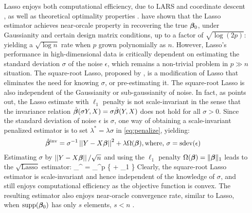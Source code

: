 \documentclass[11pt]{article}
\begin{document}
Lasso enjoys both computational efficiency, due to LARS \citep{efron_least_2004} and coordinate descent \citep{friedman_pathwise_2007}, as well as theoretical optimality properties \citep{buhlmann2011statistics}. \citet{bickel2009simultaneous} have shown that the Lasso estimator achieves near-orcale property in recovering the true $\boldsymbol{\beta}_0$, under Gaussianity and certain design matrix conditions, up to a factor of $\sqrt{\log( 2 p)}$: yielding a $\sqrt{\log n}$ rate when $p$ grown polynomially as $n$. However, Lasso's performance in high-dimensional data is critically dependent on estimating the standard deviation $\sigma$ of the noise $\epsilon$, which remains a non-trivial problem in $p \gg n$ situation. The square-root Lasso, proposed by \cite{belloni2011square}, is a modification of Lasso that eliminates the need for knowing $\sigma$, or pre-estimating it. The square-root Lasso is also independent of the Gaussianity or sub-gaussianity of noise. In fact, as \citet{giraud2014introduction} points out, the Lasso estimate with $\ell_1$ penalty is not scale-invariant in the sense that the invariance relation $\hat{\boldsymbol{\beta}}(\sigma Y, X) = \sigma \hat{\boldsymbol{\beta}}(Y, X)$ does not hold for all $\sigma > 0$. Since the standard deviation of noise $\epsilon$ is $\sigma$, one way of obtaining a scale-invariant penalized estimator is to set $\lambda^* = \lambda \sigma$ in \eqref{eq:penalize}, yielding:
\begin{align}
\hat{\boldsymbol{\beta}}^{\text{inv}} & = \sigma^{-1} \left|\left|Y - X\boldsymbol{\beta}\right|\right|^2 + \lambda \Omega(\boldsymbol{\beta}), \text{where, } \sigma = \text{sdev}(\epsilon)
\end{align}
Estimating $\sigma$ by $\left|\left|Y-X\boldsymbol{\beta}\right|\right|/\sqrt{n}$ and using the $\ell_1$ penalty $\Omega(\boldsymbol{\beta}) = \lVert\boldsymbol{\beta}\rVert_1$ leads to the $\sqrt{\text{Lasso}}$ estimator: 
\beq
\hat{\bbeta}_{\lambda}^{} = \argmin_{\bbeta \in \Re^p} \{   + \lambda \norm{\bbeta}_1 \} \label{eq:sqlasso}
\eeq
Clearly, the square-root Lasso estimator is scale-invariant and hence independent of the knowledge of $\sigma$, and still enjoys computational efficiency as the objective function is convex. The resulting estimator also enjoys near-oracle convergence rate, similar to Lasso, when $\text{supp}(\boldsymbol{\beta}_0)$ has only $s$ elements, $s < n$ \citep{belloni2011square}. 
\end{document}
